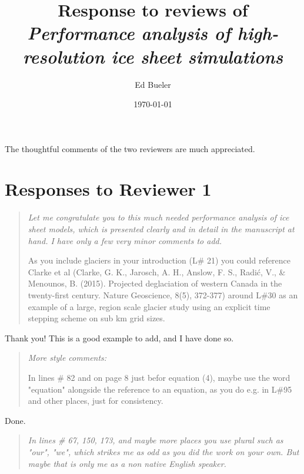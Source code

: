 \documentclass[letterpaper,final,12pt,reqno]{amsart}
\newenvironment{review}%
{\bigskip \par \begin{quote} \selectfont \sl}%
{\end{quote}}
\begin{document}
\title{Response to reviews of \emph{Performance analysis of high-resolution ice sheet simulations}}

\author{Ed Bueler}

\date{\today}

\maketitle


\thispagestyle{empty}

The thoughtful comments of the two reviewers are much appreciated.

\section{Responses to Reviewer 1}

\begin{review}
Let me congratulate you to this much needed performance analysis of ice sheet models, which is presented clearly and in detail in the manuscript at hand. I have only a few very minor comments to add.

As you include glaciers in your introduction (L\# 21) you could reference Clarke et al (Clarke, G. K., Jarosch, A. H., Anslow, F. S., Radić, V., \& Menounos, B. (2015). Projected deglaciation of western Canada in the twenty-first century. Nature Geoscience, 8(5), 372-377) around L\#30 as an example of a large, region scale glacier study using an explicit time stepping scheme on sub km grid sizes.
\end{review}

\noindent Thank you!  This is a good example to add, and I have done so.

\begin{review}
More style comments:

In lines \# 82 and on page 8 just befor equation (4), maybe use the word "equation" alongside the reference to an equation, as you do e.g. in L\#95 and other places, just for consistency.
\end{review}

\noindent Done.

\begin{review}
In lines \# 67, 150, 173, and maybe more places you use plural such as "our", "we", which strikes me as odd as you did the work on your own. But maybe that is only me as a non native English speaker.
\end{review}
\end{document}
